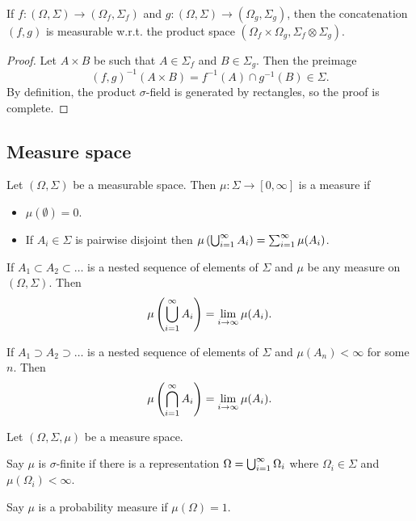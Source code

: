 \documentclass[a4paper]{article}
\begin{document}
\begin{prop}
  If $f : (\Omega, \Sigma) \to (\Omega_f, \Sigma_f)$ and
  $g : (\Omega, \Sigma) \to (\Omega_g, \Sigma_g)$, then the concatenation
  $(f, g)$ is measurable w.r.t. the product space
  $(\Omega_f \times \Omega_g, \Sigma_f \otimes \Sigma_g)$.
\end{prop}

\begin{proof}
  Let $A \times B$ be such that $A \in \Sigma_f$ and $B \in \Sigma_g$.
  Then the preimage
  \[
  (f, g)^{-1} (A \times B) = f^{-1} (A) \cap g^{-1} (B) \in \Sigma.
  \]
  By definition, the product $\sigma$-field is generated by rectangles,
  so the proof is complete.

\end{proof}

\subsection{Measure space}
\begin{defi}[measure]
  Let $(\Omega, \Sigma)$ be a measurable space. Then $\mu : \Sigma \to
  [0, \infty]$ is a measure if
  \begin{itemize}
    \item $\mu (\emptyset) = 0$.
    \item If $A_i \in \Sigma$ is pairwise disjoint then
    $\mu \left( \bigcup_{i=1}^\infty A_i \right) = \sum_{i=1}^\infty \mu (A_i)$.
  \end{itemize}
\end{defi}

\begin{prop}
  If $A_1 \subset A_2 \subset \dots$ is a nested sequence of elements
  of $\Sigma$ and $\mu$ be any measure on $(\Omega, \Sigma)$. Then
  \[
  \mu \left( \bigcup_{i=1}^\infty A_i \right) = \lim_{i \to \infty} \mu (A_i).
  \]

  If $A_1 \supset A_2 \supset \dots$ is a nested sequence of elements
  of $\Sigma$ and $\mu (A_n) < \infty$ for some $n$. Then
  \[
  \mu \left( \bigcap_{i=1}^\infty A_i \right) = \lim_{i \to \infty} \mu (A_i).
  \]
\end{prop}

\begin{defi}
  Let $(\Omega, \Sigma, \mu)$ be a measure space.

  Say $\mu$ is $\sigma$-finite
  if there is a representation $\Omega = \bigcup_{i=1}^\infty \Omega_i$ where
  $\Omega_i \in \Sigma$ and $\mu (\Omega_i) < \infty$.

  Say $\mu$ is a probability measure if $\mu(\Omega) = 1$.
\end{defi}
\end{document}
